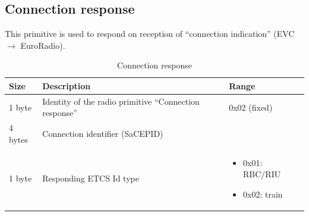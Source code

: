 \documentclass[nocc]{template/openetcs_report}
\begin{document}
\subsection{Connection response}
This primitive is used to respond on reception of "`connection indication"' (EVC $\rightarrow$ EuroRadio).
			\begin{longtable}{|l|l|l|}
				\caption{Connection response}\\ 
				\hline
				
					\begin{minipage}[t]{0.1\linewidth} \textbf{Size}	\end{minipage}
				&	\begin{minipage}[t]{0.5\linewidth} \textbf{Description}	\end{minipage}
				&	\begin{minipage}[t]{0.3\linewidth} \textbf{Range} \end{minipage} \\
				
				\hline
					 \begin{minipage}[t]{0.1\linewidth}1 byte \end{minipage}
					&\begin{minipage}[t]{0.6\linewidth}Identity of the radio primitive "`Connection response"'	\end{minipage}
					&\begin{minipage}[t]{0.3\linewidth}0x02 (fixed) \end{minipage} \\
					
				\hline
					 \begin{minipage}[t]{0.1\linewidth}4 bytes \end{minipage}
					&\begin{minipage}[t]{0.6\linewidth}Connection identifier (SaCEPID)	\end{minipage}
					&\begin{minipage}[t]{0.3\linewidth} \end{minipage} \\
					
				\hline
					 \begin{minipage}[t]{0.1\linewidth}1 byte \end{minipage}
					&\begin{minipage}[t]{0.6\linewidth}Responding ETCS Id type	\end{minipage}
					&\begin{minipage}[t]{0.3\linewidth}
							\begin{itemize}
								\item 0x01: RBC/RIU
								\item 0x02: train
							\end{itemize}						
					  \end{minipage} \\
					

\end{longtable}
\end{document}
